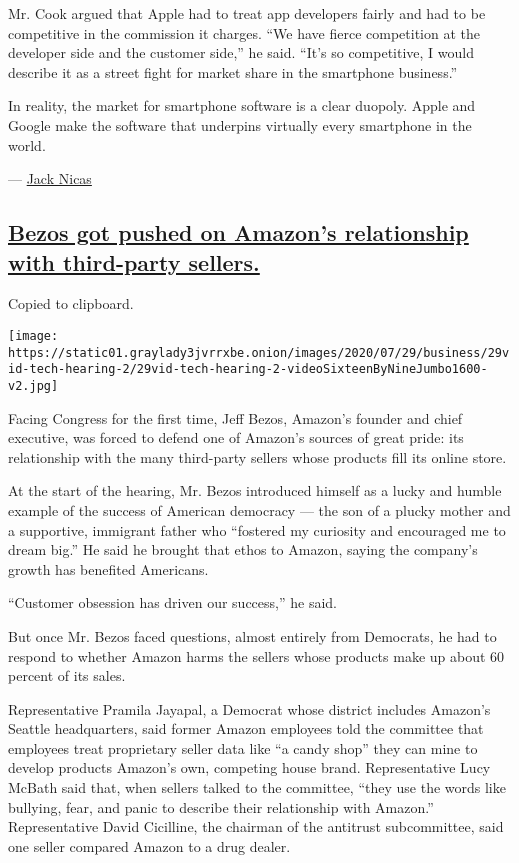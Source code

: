 Mr. Cook argued that Apple had to treat app developers fairly and had to
be competitive in the commission it charges. ``We have fierce
competition at the developer side and the customer side,'' he said.
``It's so competitive, I would describe it as a street fight for market
share in the smartphone business.''

In reality, the market for smartphone software is a clear duopoly. Apple
and Google make the software that underpins virtually every smartphone
in the world.

--- \href{https://www.nytimes3xbfgragh.onion/by/jack-nicas}{Jack Nicas}

\hypertarget{bezos-got-pushed-on-amazons-relationship-with-third-party-sellers}{%
\subsection{\texorpdfstring{\protect\hyperlink{bezos-got-pushed-on-amazons-relationship-with-third-party-sellers}{Bezos
got pushed on Amazon's relationship with third-party
sellers.}}{Bezos got pushed on Amazon's relationship with third-party sellers.}}\label{bezos-got-pushed-on-amazons-relationship-with-third-party-sellers}}

Copied to clipboard.

\texttt{[image: https://static01.graylady3jvrrxbe.onion/images/2020/07/29/business/29vid-tech-hearing-2/29vid-tech-hearing-2-videoSixteenByNineJumbo1600-v2.jpg]}

Facing Congress for the first time, Jeff Bezos, Amazon's founder and
chief executive, was forced to defend one of Amazon's sources of great
pride: its relationship with the many third-party sellers whose products
fill its online store.

At the start of the hearing, Mr. Bezos introduced himself as a lucky and
humble example of the success of American democracy --- the son of a
plucky mother and a supportive, immigrant father who ``fostered my
curiosity and encouraged me to dream big.'' He said he brought that
ethos to Amazon, saying the company's growth has benefited Americans.

``Customer obsession has driven our success,'' he said.

But once Mr. Bezos faced questions, almost entirely from Democrats, he
had to respond to whether Amazon harms the sellers whose products make
up about 60 percent of its sales.

Representative Pramila Jayapal, a Democrat whose district includes
Amazon's Seattle headquarters, said former Amazon employees told the
committee that employees treat proprietary seller data like ``a candy
shop'' they can mine to develop products Amazon's own, competing house
brand. Representative Lucy McBath said that, when sellers talked to the
committee, ``they use the words like bullying, fear, and panic to
describe their relationship with Amazon.'' Representative David
Cicilline, the chairman of the antitrust subcommittee, said one seller
compared Amazon to a drug dealer.

